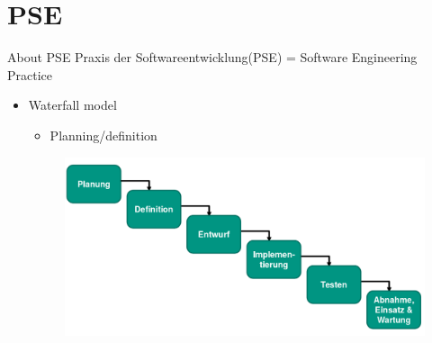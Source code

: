 \section{PSE}

\begin{frame}{About PSE}
	Praxis der Softwareentwicklung(PSE) = Software Engineering Practice
	\begin{itemize}
		\item Waterfall model
		 \begin{itemize} 
			\item Planning/definition
		\end{itemize}
		\begin{figure}[htb]
		    \centering
		      \includegraphics[width=.80\textwidth, height=.80\textheight, keepaspectratio]{./resources/wasserfallmodell.png}
		      \nocite{swt:wfm}
		  \end{figure}
	\end{itemize}
\end{frame}
